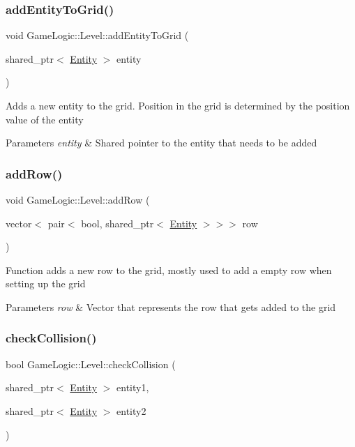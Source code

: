 \subsubsection{\texorpdfstring{add\+Entity\+To\+Grid()}{addEntityToGrid()}}
{\footnotesize\ttfamily void Game\+Logic\+::\+Level\+::add\+Entity\+To\+Grid (\begin{DoxyParamCaption}\item[{shared\+\_\+ptr$<$ \hyperlink{classGameLogic_1_1Entity}{Entity} $>$}]{entity }\end{DoxyParamCaption})}

Adds a new entity to the grid. Position in the grid is determined by the position value of the entity 
\begin{DoxyParams}{Parameters}
{\em entity} & Shared pointer to the entity that needs to be added \\
\hline
\end{DoxyParams}
\mbox{\label{classGameLogic_1_1Level_a42e42fda28e7f43286d9beb166d1e3f9}} 
\subsubsection{\texorpdfstring{add\+Row()}{addRow()}}
{\footnotesize\ttfamily void Game\+Logic\+::\+Level\+::add\+Row (\begin{DoxyParamCaption}\item[{vector$<$ pair$<$ bool, shared\+\_\+ptr$<$ \hyperlink{classGameLogic_1_1Entity}{Entity} $>$$>$$>$}]{row }\end{DoxyParamCaption})}

Function adds a new row to the grid, mostly used to add a empty row when setting up the grid 
\begin{DoxyParams}{Parameters}
{\em row} & Vector that represents the row that gets added to the grid \\
\hline
\end{DoxyParams}
\mbox{\label{classGameLogic_1_1Level_aaf7dd085cfe83d8c59f224f8d0acc6ec}} 
\subsubsection{\texorpdfstring{check\+Collision()}{checkCollision()}}
{\footnotesize\ttfamily bool Game\+Logic\+::\+Level\+::check\+Collision (\begin{DoxyParamCaption}\item[{shared\+\_\+ptr$<$ \hyperlink{classGameLogic_1_1Entity}{Entity} $>$}]{entity1,  }\item[{shared\+\_\+ptr$<$ \hyperlink{classGameLogic_1_1Entity}{Entity} $>$}]{entity2 }\end{DoxyParamCaption})}

